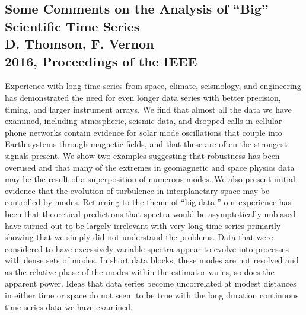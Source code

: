 \documentclass{article}
\begin{document}
\subsection{Some Comments on the Analysis of “Big” Scientific Time Series \\
D. Thomson, F. Vernon \\
2016, Proceedings of the IEEE}
Experience with long time series from space, climate, seismology, and engineering has demonstrated the need for even longer data series with better precision, timing, and larger instrument arrays. We find that almost all the data we have examined, including atmospheric, seismic data, and dropped calls in cellular phone networks contain evidence for solar mode oscillations that couple into Earth systems through magnetic fields, and that these are often the strongest signals present. We show two examples suggesting that robustness has been overused and that many of the extremes in geomagnetic and space physics data may be the result of a superposition of numerous modes. We also present initial evidence that the evolution of turbulence in interplanetary space may be controlled by modes. Returning to the theme of “big data,” our experience has been that theoretical predictions that spectra would be asymptotically unbiased have turned out to be largely irrelevant with very long time series primarily showing that we simply did not understand the problems. Data that were considered to have excessively variable spectra appear to evolve into processes with dense sets of modes. In short data blocks, these modes are not resolved and as the relative phase of the modes within the estimator varies, so does the apparent power. Ideas that data series become uncorrelated at modest distances in either time or space do not seem to be true with the long duration continuous time series data we have examined.\\

\\
\end{document}
